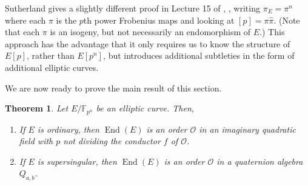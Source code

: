 \documentclass{amsart}
\newtheorem{thm}{Theorem}[section]
\theoremstyle{definition}
\theoremstyle{remark}
\numberwithin{equation}{section}
\newcommand{\cO}{\mathcal O}
\newcommand{\bbF}{\mathbb F}
\DeclareMathOperator{\End}{End}
\begin{document}
Sutherland gives a slightly different proof in Lecture 15 of \cite{SutherlandLN},
, writing $\pi_{E} = \pi^n$ where each $\pi$ is the $p$th power Frobenius maps and looking at $[p] = \pi \widehat{\pi}$. (Note that each $\pi$ is an isogeny, but not necessarily an endomorphism of $E$.) This approach has the advantage that it only requires us to know the structure of $E[p]$, rather than $E[p^n]$, but introduces additional subtleties in the form of additional elliptic curves.

We are now ready to prove the main result of this section. 

\begin{thm} \label{thm:EndoRingsInFiniteFields}
Let $E/\bbF_{p^n}$ be an elliptic curve. Then,
\begin{enumerate}
\item If $E$ is ordinary, then $\End(E)$ is an order $\cO$ in an imaginary quadratic field with $p$ not dividing the conductor $f$ of $\cO$.
\item If $E$ is supersingular, then $\End(E)$ is an order $\cO$ in a quaternion algebra $Q_{a,b}$.
\end{enumerate}
\end{thm}
\end{document}
